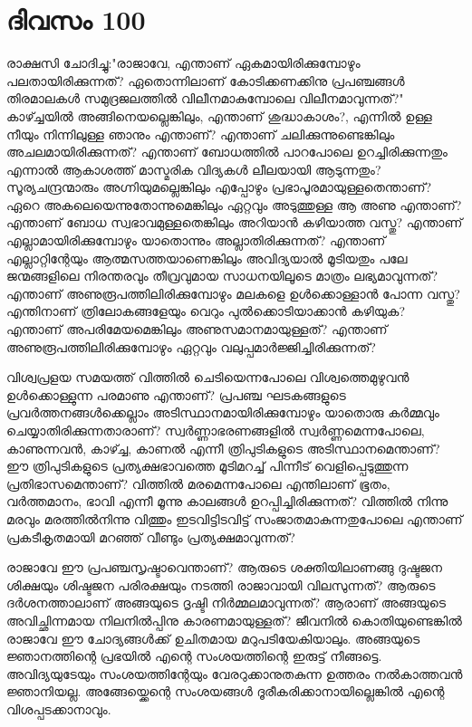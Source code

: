  
\section{ദിവസം 100}


രാക്ഷസി ചോദിച്ചു:"രാജാവേ, എന്താണ്‌ ഏകമായിരിക്കുമ്പോഴും പലതായിരിക്കുന്നത്‌? ഏതൊന്നിലാണ്‌ കോടിക്കണക്കിനു പ്രപഞ്ചങ്ങള്‍ തിരമാലകള്‍ സമുദ്രജലത്തില്‍ വിലീനമാകുമ്പോലെ വിലീനമാവുന്നത്‌?" കാഴ്ച്ചയില്‍ അങ്ങിനെയല്ലെങ്കിലും, എന്താണ്‌ ശുദ്ധാകാശം?,  എന്നില്‍ ഉള്ള നീയും നിന്നിലുള്ള ഞാനും എന്താണ്‌? എന്താണ്‌ ചലിക്കുന്നുണ്ടെങ്കിലും അചലമായിരിക്കുന്നത്‌? എന്താണ്‌ ബോധത്തില്‍ പാറപോലെ ഉറച്ചിരിക്കുന്നതും എന്നാല്‍ ആകാശത്ത്‌ മാസ്മരിക വിദ്യകള്‍ ലീലയായി ആടുന്നതും? സൂര്യചന്ദ്രന്മാരും അഗ്നിയുമല്ലെങ്കിലും എപ്പോഴും പ്രഭാപൂരമായുള്ളതെന്താണ്‌? ഏറെ അകലെയെന്നുതോന്നുമെങ്കിലും ഏറ്റവും അടുത്തുള്ള ആ അണു എന്താണ്‌? എന്താണ്‌ ബോധ സ്വഭാവമുള്ളതെങ്കിലും അറിയാന്‍ കഴിയാത്ത വസ്തു? എന്താണ്‌ എല്ലാമായിരിക്കുമ്പോഴും യാതൊന്നും അല്ലാതിരിക്കുന്നത്‌? എന്താണ്‌ എല്ലാറ്റിന്റേയും ആത്മസത്തയാണെങ്കിലും അവിദ്യയാല്‍ മൂടിയതും പലേ ജന്മങ്ങളിലെ നിരന്തരവും തീവ്രവുമായ സാധനയിലൂടെ മാത്രം ലഭ്യമാവുന്നത്‌? എന്താണ്‌ അണുരൂപത്തിലിരിക്കുമ്പോഴും മലകളെ ഉള്‍ക്കൊള്ളാന്‍ പോന്ന വസ്തു? എന്തിനാണ്‌ ത്രിലോകങ്ങളേയും വെറും പുല്‍ക്കൊടിയാക്കാന്‍ കഴിയുക? എന്താണ്‌ അപരിമേയമെങ്കിലും അണുസമാനമായുള്ളത്‌? എന്താണ്‌ അണുരൂപത്തിലിരിക്കുമ്പോഴും ഏറ്റവും വലുപ്പമാര്‍ജ്ജിച്ചിരിക്കുന്നത്‌? 

വിശ്വപ്രളയ സമയത്ത്‌ വിത്തില്‍ ചെടിയെന്നപോലെ വിശ്വത്തെമുഴുവന്‍ ഉള്‍ക്കൊള്ളുന്ന പരമാണു എന്താണ്‌? പ്രപഞ്ച ഘടകങ്ങളുടെ പ്രവര്‍ത്തനങ്ങള്‍ക്കെല്ലാം അടിസ്ഥാനമായിരിക്കുമ്പോഴും യാതൊരു കര്‍മ്മവും ചെയ്യാതിരിക്കുന്നതാരാണ്‌? സ്വര്‍ണ്ണാഭരണങ്ങളില്‍ സ്വര്‍ണ്ണമെന്നപോലെ, കാണുന്നവന്‍, കാഴ്ച്ച, കാണല്‍ എന്നീ ത്രിപുടികളുടെ അടിസ്ഥാനമെന്താണ്‌? ഈ ത്രിപുടികളുടെ പ്രത്യക്ഷഭാവത്തെ മൂടിമറച്ച്‌ പിന്നീട്‌ വെളിപ്പെടുത്തുന്ന പ്രതിഭാസമെന്താണ്‌? വിത്തില്‍ മരമെന്നപോലെ എന്തിലാണ്‌ ഭൂതം, വര്‍ത്തമാനം, ഭാവി എന്നീ മൂന്നു കാലങ്ങള്‍ ഉറപ്പിച്ചിരിക്കുന്നത്‌? വിത്തില്‍ നിന്നു മരവും മരത്തില്‍നിന്നു വിത്തും ഇടവിട്ടിടവിട്ട്‌ സംജാതമാകുന്നതുപോലെ എന്താണ്‌ പ്രകടീകൃതമായി മറഞ്ഞ്‌ വീണ്ടും പ്രത്യക്ഷമാവുന്നത്‌? 

രാജാവേ ഈ പ്രപഞ്ചസൃഷ്ടാവെന്താണ്‌? ആരുടെ ശക്തിയിലാണങ്ങു ദുഷ്ടജന ശിക്ഷയും ശിഷ്ടജന പരിരക്ഷയും നടത്തി രാജാവായി വിലസുന്നത്‌? ആരുടെ ദര്‍ശനത്താലാണ്‌ അങ്ങയുടെ ദൃഷ്ടി നിര്‍മ്മലമാവുന്നത്‌? ആരാണ്‌ അങ്ങയുടെ അവിച്ഛിന്നമായ നിലനില്‍പ്പിനു കാരണമായുള്ളത്‌? ജീവനില്‍ കൊതിയുണ്ടെങ്കില്‍ രാജാവേ ഈ ചോദ്യങ്ങള്‍ക്ക്‌ ഉചിതമായ മറുപടിയേകിയാലും. അങ്ങയുടെ ജ്ഞാനത്തിന്റെ പ്രഭയില്‍ എന്റെ സംശയത്തിന്റെ ഇരുട്ട്‌ നീങ്ങട്ടെ. അവിദ്യയുടേയും സംശയത്തിന്റേയും വേരറുക്കാനുതകുന്ന ഉത്തരം നല്‍കാത്തവന്‍ ജ്ഞാനിയല്ല. അങ്ങേയ്ക്കെന്റെ സംശയങ്ങള്‍ ദൂരീകരിക്കാനായില്ലെങ്കില്‍ എന്റെ വിശപ്പടക്കാനാവും.
